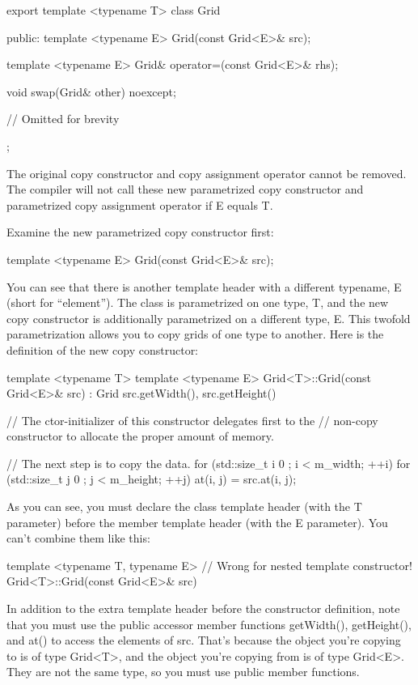 \begin{cpp}
export template <typename T>
class Grid
{
    public:
        template <typename E>
        Grid(const Grid<E>& src);

        template <typename E>
        Grid& operator=(const Grid<E>& rhs);

        void swap(Grid& other) noexcept;

        // Omitted for brevity
};
\end{cpp}

The original copy constructor and copy assignment operator cannot be removed. The compiler will not call these new parametrized copy constructor and parametrized copy assignment operator if E equals T.

Examine the new parametrized copy constructor first:

\begin{cpp}
template <typename E>
Grid(const Grid<E>& src);
\end{cpp}

You can see that there is another template header with a different typename, E (short for “element”). The class is parametrized on one type, T, and the new copy constructor is additionally parametrized on a different type, E. This twofold parametrization allows you to copy grids of one type to another. Here is the definition of the new copy constructor:

\begin{cpp}
template <typename T>
template <typename E>
Grid<T>::Grid(const Grid<E>& src)
    : Grid { src.getWidth(), src.getHeight() }
{
    // The ctor-initializer of this constructor delegates first to the
    // non-copy constructor to allocate the proper amount of memory.

    // The next step is to copy the data.
    for (std::size_t i { 0 }; i < m_width; ++i) {
        for (std::size_t j { 0 }; j < m_height; ++j) {
            at(i, j) = src.at(i, j);
        }
    }
}
\end{cpp}

As you can see, you must declare the class template header (with the T parameter) before the member template header (with the E parameter). You can’t combine them like this:

\begin{cpp}
template <typename T, typename E> // Wrong for nested template constructor!
Grid<T>::Grid(const Grid<E>& src)
\end{cpp}

In addition to the extra template header before the constructor definition, note that you must use the public accessor member functions getWidth(), getHeight(), and at() to access the elements of src. That’s because the object you’re copying to is of type Grid<T>, and the object you’re copying from is of type Grid<E>. They are not the same type, so you must use public member functions.


